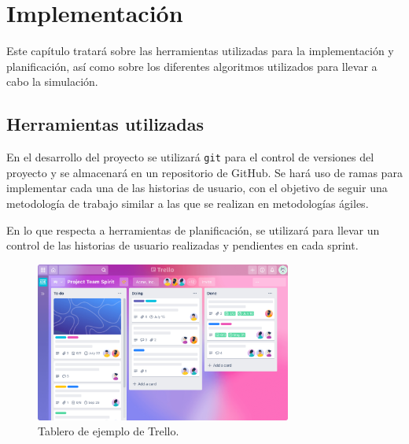 \chapter{Implementación}


Este capítulo tratará sobre las herramientas utilizadas para la implementación y planificación, así como sobre los diferentes algoritmos utilizados para llevar a cabo la simulación.

\section{Herramientas utilizadas}

En el desarrollo del proyecto se utilizará \verb|git| para el control de versiones del proyecto y se almacenará en un repositorio de GitHub. Se hará uso de ramas 
para implementar cada una de las historias de usuario, con el objetivo de seguir una metodología de trabajo similar a las que se realizan en metodologías ágiles.




\bigskip

En lo que respecta a herramientas de planificación, se utilizará \planApp para llevar un control de las historias de usuario realizadas y pendientes en cada sprint.

\begin{figure}[H]
    \centering
    \includegraphics[width=0.75\textwidth]{imagenes/trello.png}
    \caption{Tablero de ejemplo de Trello\cite{tablero-trello}.}
\end{figure}

